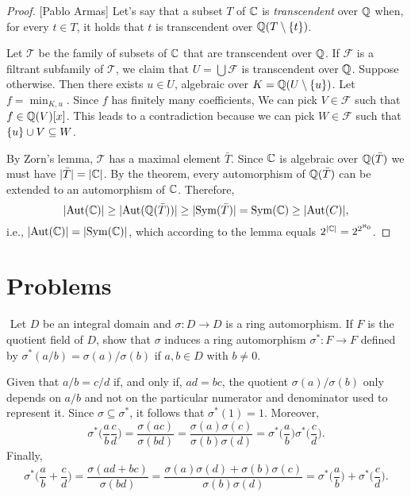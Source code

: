 \begin{proof}{[Pablo Armas]}
    Let's say that a subset $T$ of $\mathbb{C}$ is \textsl{transcendent\/} over $\mathbb{Q}$ when, for every $t\in T$, it holds that $t$ is transcendent over $\mathbb{Q}(T\setminus\{t\})$.
    
    Let $\mathcal T$ be the family of subsets of $\mathbb{C}$ that are transcendent over $\mathbb{Q}$. If $\mathcal F$ is a filtrant subfamily of $\mathcal T$, we claim that $U=\bigcup\mathcal F$ is transcendent over $\mathbb{Q}$. Suppose otherwise. Then there exists $u\in U$, algebraic over $K=\mathbb{Q}(U\setminus\{u\})$. Let $f=\min_{K,u}$. Since $f$ has finitely many coefficients, We can pick $V\in\mathcal F$ such that $f\in\mathbb{Q}(V)[x]$. This leads to a contradiction because we can pick $W\in\mathcal F$ such that $\{u\}\cup V\subseteq W$.
    
    By Zorn's lemma, $\mathcal T$ has a maximal element $\bar T$. Since $\mathbb{C}$ is algebraic over $\mathbb{Q}(\bar T)$ we must have $|\bar T|=|\mathbb{C}|$. By the theorem, every automorphism of $\mathbb{Q}(\bar T)$ can be extended to an automorphism of $\mathbb{C}$. Therefore,
    $$
        |{\rm Aut}(\mathbb{C})|\ge|{\rm Aut}(\mathbb{Q}(\bar T))|\ge|{\rm Sym}(\bar T)|
           = {\rm Sym}(\mathbb{C})\ge|{\rm Aut}(C)|,
    $$
    i.e., $|{\rm Aut}(\mathbb{C})|=|{\rm Sym}(\mathbb{C})|$, which according to the lemma equals $2^{|\mathbb{C}|} = 2^{2^{\aleph_0}}$.
\end{proof}

\section{Problems}

\begin{probl}${}$
    Let\/ $D$ be an integral domain and $\sigma\colon D \to D$ is a ring automorphism. If\/ $F$ is the quotient field of\/ $D$, show that\/ $\sigma$ induces a ring automorphism $\sigma^*\colon F \to F$ defined by\/ $\sigma^*(a/b) = \sigma(a)/\sigma(b)$ if\/ $a, b \in D$ with\/ $b \neq 0$.
\end{probl}

\begin{solution}
    Given that $a/b=c/d$ if, and only if, $ad=bc$, the quotient $\sigma(a)/\sigma(b)$ only depends on $a/b$ and not on the particular numerator and denominator used to represent it. Since $\sigma\subseteq\sigma^*$, it follows that $\sigma^*(1)=1$. Moreover,
    $$
        \sigma^*\Big(\frac ab\frac cd\Big)
            = \frac{\sigma(ac)}{\sigma(bd)}
            = \frac{\sigma(a)\sigma(c)}{\sigma(b)\sigma(d)}
            = \sigma^*\Big(\frac ab\Big)\sigma^*\Big(\frac cd\Big).
    $$
    Finally,
    $$
        \sigma^*\Big(\frac ab+\frac cd\Big)
            = \frac{\sigma(ad+bc)}{\sigma(bd)}
            = \frac{\sigma(a)\sigma(d)+\sigma(b)\sigma(c)}{\sigma(b)\sigma(d)}
            = \sigma^*\Big(\frac ab\Big)+\sigma^*\Big(\frac cd\Big).
    $$
\end{solution}

